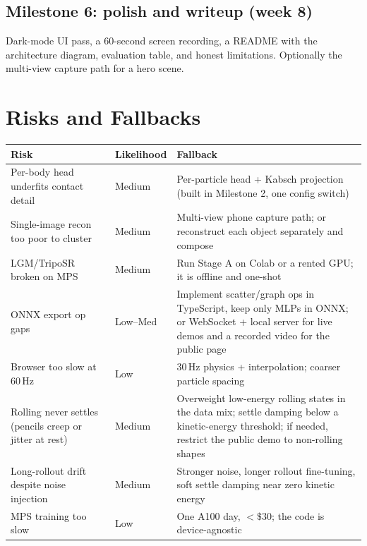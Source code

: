 \documentclass[11pt]{article}
\begin{document}
\subsection{Milestone 6: polish and writeup (week 8)}
Dark-mode UI pass, a 60-second screen recording, a README with the architecture diagram, evaluation table, and honest limitations. Optionally the multi-view capture path for a hero scene.

\section{Risks and Fallbacks}

\begin{center}
\begin{tabular}{@{}p{5.2cm}p{2.2cm}p{6.6cm}@{}}
\toprule
\textbf{Risk} & \textbf{Likelihood} & \textbf{Fallback} \\
\midrule
Per-body head underfits contact detail & Medium & Per-particle head + Kabsch projection (built in Milestone 2, one config switch) \\
Single-image recon too poor to cluster & Medium & Multi-view phone capture path; or reconstruct each object separately and compose \\
LGM/TripoSR broken on MPS & Medium & Run Stage A on Colab or a rented GPU; it is offline and one-shot \\
ONNX export op gaps & Low--Med & Implement scatter/graph ops in TypeScript, keep only MLPs in ONNX; or WebSocket + local server for live demos and a recorded video for the public page \\
Browser too slow at 60\,Hz & Low & 30\,Hz physics + interpolation; coarser particle spacing \\
Rolling never settles (pencils creep or jitter at rest) & Medium & Overweight low-energy rolling states in the data mix; settle damping below a kinetic-energy threshold; if needed, restrict the public demo to non-rolling shapes \\
Long-rollout drift despite noise injection & Medium & Stronger noise, longer rollout fine-tuning, soft settle damping near zero kinetic energy \\
MPS training too slow & Low & One A100 day, $<\$30$; the code is device-agnostic \\
\bottomrule
\end{tabular}
\end{center}
\end{document}
